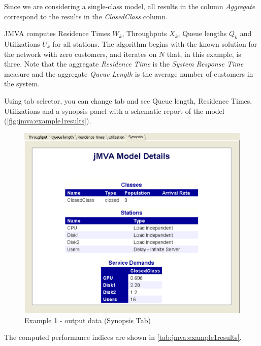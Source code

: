 Since we are considering a single-class model, all results in the
column \emph{Aggregate} correspond to the results in the
\emph{ClosedClass} column.

JMVA computes Residence Times $W_k$, Throughputs $X_k$, Queue
lengths $Q_k$ and Utilizations $U_k$ for all stations. The algorithm
begins with the known solution for the network with zero customers,
and iterates on $N$ that, in this example, is three. Note that the
aggregate \emph{Residence Time} is the \emph{System Response Time}
measure and the aggregate \emph{Queue Length} is the average number
of customers in the system.

Using tab selector, you can change tab and see Queue length,
Residence Times, Utilizations and a synopsis panel with a schematic
report of the model (\autoref{fig:jmva:example1results}).

\begin{figure}[htbp]
    \begin{center}
        \includegraphics[scale=.5]{img/jmva/example1results}
    \end{center}
    \caption{Example 1 - output data (Synopsis Tab)}
    \label{fig:jmva:example1results}
\end{figure}

The computed performance indices are shown in
\autoref{tab:jmva:example1results}.

